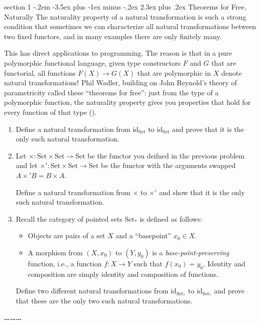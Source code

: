 \documentclass[12pt]{article}
\makeatletter
\newenvironment{problem}{\@startsection
       {section}
       {1}
       {-.2em}
       {-3.5ex plus -1ex minus -.2ex}
       {2.3ex plus .2ex}
       {\pagebreak[3]%
       \large\bf\noindent{Problem }
       }
       }
       {%
       \begin{center}\large\bf \ldots\ldots\ldots\end{center}}
\newcommand{\Set}{\textrm{Set}}
\newcommand{\id}{\textrm{id}}
\makeatother
\begin{document}
\begin{problem}{Theorems for Free, Naturally}
  The naturality property of a natural transformation is such a strong
  condition that sometimes we can characterize all natural
  transformations between two fixed functors, and in many examples
  there are only finitely many.
  
  This has direct applications to programming. The reason is that in a
  pure polymorphic functional language, given type constructors $F$
  and $G$ that are functorial, all functions $F(X) \to G(X)$ that are
  polymorphic in $X$ denote natural transformations! Phil Wadler,
  building on John Reynold's theory of parametricity called these
  ``theorems for free'': just from the type of a polymorphic function,
  the naturality property gives you properties that hold for every
  function of that type (\cite{wadler,reynolds}).
  \begin{enumerate}
  \item Define a natural transformation from $\id_{\Set}$ to
    $\id_{\Set}$ and prove that it is the only such natural
    transformation.

  \item Let $\times : \Set \times \Set \to \Set$ be the functor you
    deifned in the previous problem and let $\times' : \Set \times
    \Set \to \Set$ be the functor with the arguments swapped $A
    \times' B = B \times A$.

    Define a natural transformation from $\times$ to $\times'$ and
    show that it is the only such natural transformation.

  \item Recall the category of pointed sets $\Set_*$ is defined as follows:
    \begin{itemize}
    \item Objects are pairs of a set $X$ and a ``basepoint'' $x_0 \in X$.
    \item A morphism from $(X,x_0)$ to $(Y, y_0)$ is a
      \emph{base-point-preserving} function, i.e., a function $f : X
      \to Y$ such that $f(x_0) = y_0$. Identity and composition are
      simply identity and composition of functions.
    \end{itemize}

    Define two different natural transformations from
    $\id_{\Set_*}$ to $\id_{\Set_*}$ and prove that these
    are the only two such natural transformations.
  \end{enumerate}
\end{problem}
\newpage

\end{document}
